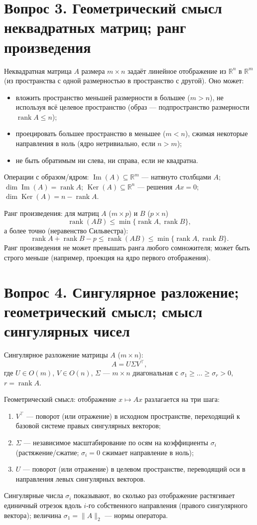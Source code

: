 \documentclass[12pt,a4paper]{article}
\DeclareMathOperator{\rank}{rank}
\begin{document}
\section{Вопрос 3. Геометрический смысл неквадратных матриц; ранг произведения}
Неквадратная матрица $A$ размера $m\times n$ задаёт линейное отображение
из $\mathbb R^n$ в $\mathbb R^m$ (из пространства с одной размерностью
в пространство с другой). Оно может:
\begin{itemize}
    \item вложить пространство меньшей размерности в большее ($m>n$),
    не используя всё целевое пространство (образ — подпространство
    размерности $\rank A \le n$);
    \item проецировать большее пространство в меньшее ($m<n$),
    сжимая некоторые направления в ноль (ядро нетривиально, если $n>m$);
    \item не быть обратимым ни слева, ни справа, если не квадратна.
\end{itemize}
Операции с образом/ядром: $\operatorname{Im}(A)\subseteq\mathbb R^m$ —
натянуто столбцами $A$; $\dim\operatorname{Im}(A)=\rank A$;
$\operatorname{Ker}(A)\subseteq\mathbb R^n$ — решения $Ax=0$;
$\dim\operatorname{Ker}(A)=n-\rank A$.

Ранг произведения: для матриц $A$ ($m\times p$) и $B$ ($p\times n$)
\[
    \rank(AB)\le\min\{\rank A,\rank B\},
\]
а более точно (неравенство Сильвестра):
\[
    \rank A + \rank B - p \le \rank(AB) \le \min\{\rank A,\rank B\}.
\]
Ранг произведения не может превышать ранга любого сомножителя; может быть
строго меньше (например, проекция на ядро первого отображения).

\section{Вопрос 4. Сингулярное разложение; геометрический смысл; смысл сингулярных чисел}
Сингулярное разложение матрицы $A$ ($m\times n$):
\[
    A = U\Sigma V^\top,
\]
где $U\in O(m)$, $V\in O(n)$, $\Sigma$ — $m\times n$ диагональная с
$\sigma_1\ge\dots\ge\sigma_r>0$, $r=\rank A$.

Геометрический смысл: отображение $x\mapsto Ax$ разлагается на три шага:
\begin{enumerate}
    \item $V^\top$ — поворот (или отражение) в исходном пространстве,
    переходящий к базовой системе правых сингулярных векторов;
    \item $\Sigma$ — независимое масштабирование по осям на коэффициенты
    $\sigma_i$ (растяжение/сжатие; $\sigma_i=0$ сжимает направление в ноль);
    \item $U$ — поворот (или отражение) в целевом пространстве, переводящий
    оси в направления левых сингулярных векторов.
\end{enumerate}
Сингулярные числа $\sigma_i$ показывают, во сколько раз отображение
растягивает единичный отрезок вдоль $i$-го собственного направления
(правого сингулярного вектора); величина $\sigma_1 = \|A\|_2$ — нормы
оператора.
\end{document}
